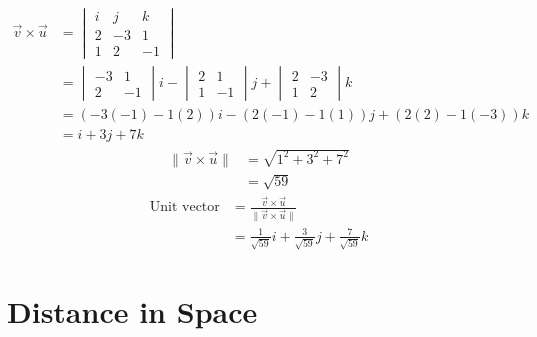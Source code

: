 \documentclass{report}
\begin{document}
\begin{align*}
    \vec{v} \times \vec{u} & = \begin{vmatrix}
                                   i & j  & k  \\
                                   2 & -3 & 1  \\
                                   1 & 2  & -1
                               \end{vmatrix}                     \\
                           & = \begin{vmatrix}
                                   -3 & 1  \\
                                   2  & -1
                               \end{vmatrix}i - \begin{vmatrix}
                                                    2 & 1  \\
                                                    1 & -1
                                                \end{vmatrix}j + \begin{vmatrix}
                                                                     2 & -3 \\
                                                                     1 & 2
                                                                 \end{vmatrix}k     \\
                           & = (-3(-1) - 1(2))i - (2(-1) - 1(1))j + (2(2) - 1(-3))k \\
                           & = i + 3j + 7k
\end{align*}
\begin{align*}
    \lVert \vec{v} \times \vec{u} \rVert & = \sqrt{1^2 + 3^2 + 7^2} \\
                                         & = \sqrt{59}
\end{align*}
\begin{align*}
    \text{Unit vector} & = \frac{\vec{v} \times \vec{u}}{\lVert \vec{v} \times \vec{u} \rVert} \\
                       & = \frac{1}{\sqrt{59}}i + \frac{3}{\sqrt{59}}j + \frac{7}{\sqrt{59}}k
\end{align*}

\chapter{Distance in Space}
\end{document}
